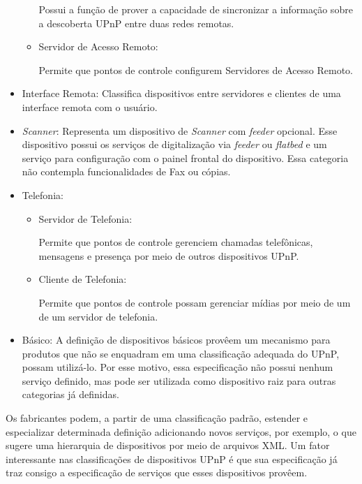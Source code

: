 \begin{itemize}
\begin{itemize}
			Possui a função de prover a capacidade de sincronizar a informação sobre a descoberta UPnP entre duas redes remotas.
		
		\item Servidor de Acesso Remoto:
		
			Permite que pontos de controle configurem Servidores de Acesso Remoto.

	\end{itemize}

\item Interface Remota:
	Classifica dispositivos entre servidores e clientes de uma interface remota com o usuário.

\item \emph{Scanner}:
	Representa um dispositivo de \emph{Scanner} com \emph{feeder} opcional. Esse dispositivo possui os serviços de digitalização via \emph{feeder} ou \emph{flatbed} e um serviço para configuração com o painel frontal do dispositivo. Essa categoria não contempla funcionalidades de Fax ou cópias.

\item Telefonia:
	\begin{itemize}
		\item Servidor de Telefonia:

			Permite que pontos de controle gerenciem chamadas telefônicas, mensagens e presença por meio de outros dispositivos UPnP. 

		\item Cliente de Telefonia:
		
			Permite que pontos de controle possam gerenciar mídias por meio de um de um servidor de telefonia.
				
	\end{itemize}

\item Básico:
	A definição de dispositivos básicos provêem um mecanismo para produtos que não se enquadram em uma classificação adequada do UPnP, possam utilizá-lo. Por esse motivo, essa especificação não possui nenhum serviço definido, mas pode ser utilizada como dispositivo raiz para outras categorias já definidas.
\end{itemize}

Os fabricantes podem, a partir de uma classificação padrão, estender e especializar determinada definição adicionando novos serviços, por exemplo, o que sugere uma hierarquia de dispositivos por meio de arquivos XML. Um fator interessante nas classificações de dispositivos UPnP é que sua especificação já traz consigo a especificação de serviços que esses dispositivos provêem. 
